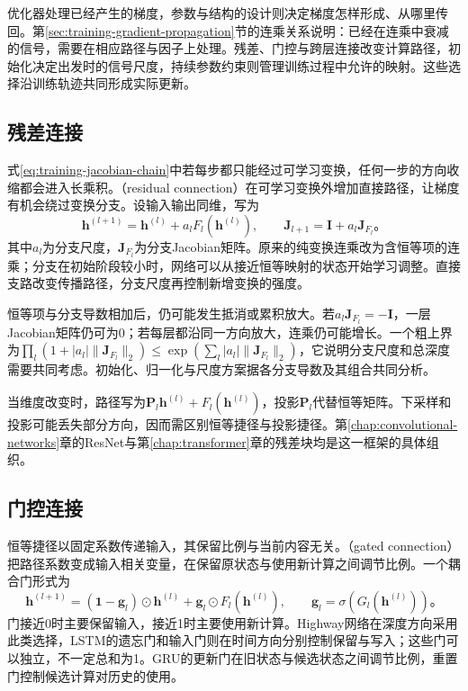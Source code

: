 优化器处理已经产生的梯度，参数与结构的设计则决定梯度怎样形成、从哪里传回。第\ref{sec:training-gradient-propagation}节的连乘关系说明：已经在连乘中衰减的信号，需要在相应路径与因子上处理。残差、门控与跨层连接改变计算路径，初始化决定出发时的信号尺度，持续参数约束则管理训练过程中允许的映射。这些选择沿训练轨迹共同形成实际更新。

\subsection{残差连接}
\label{sec:training-residual}

式\eqref{eq:training-jacobian-chain}中若每步都只能经过可学习变换，任何一步的方向收缩都会进入长乘积。（residual connection）在可学习变换外增加直接路径，让梯度有机会绕过变换分支。设输入输出同维，写为
\begin{equation}
  \bm h^{(l+1)}=\bm h^{(l)}+a_lF_l(\bm h^{(l)}),\qquad
  \bm J_{l+1}=\bm I+a_l\bm J_{F_l}\text{。}
  \label{eq:training-residual-jacobian}
\end{equation}
其中$a_l$为分支尺度，$\bm J_{F_l}$为分支Jacobian矩阵。原来的纯变换连乘改为含恒等项的连乘；分支在初始阶段较小时，网络可以从接近恒等映射的状态开始学习调整。直接支路改变传播路径，分支尺度再控制新增变换的强度。

恒等项与分支导数相加后，仍可能发生抵消或累积放大。若$a_l\bm J_{F_l}=-\bm I$，一层Jacobian矩阵仍可为0；若每层都沿同一方向放大，连乘仍可能增长。一个粗上界为$\prod_l(1+|a_l|\lVert\bm J_{F_l}\rVert_2)\leq\exp(\sum_l|a_l|\lVert\bm J_{F_l}\rVert_2)$，它说明分支尺度和总深度需要共同考虑。初始化、归一化与尺度方案据各分支导数及其组合共同分析。

当维度改变时，路径写为$\bm P_l\bm h^{(l)}+F_l(\bm h^{(l)})$，投影$\bm P_l$代替恒等矩阵。下采样和投影可能丢失部分方向，因而需区别恒等捷径与投影捷径。第\ref{chap:convolutional-networks}章的ResNet与第\ref{chap:transformer}章的残差块均是这一框架的具体组织。

\subsection{门控连接}
\label{sec:training-gates}

恒等捷径以固定系数传递输入，其保留比例与当前内容无关。（gated connection）把路径系数变成输入相关变量，在保留原状态与使用新计算之间调节比例。一个耦合门形式为
\begin{equation}
  \bm h^{(l+1)}=(\bm1-\bm g_l)\odot\bm h^{(l)}
                   +\bm g_l\odot F_l(\bm h^{(l)}),
  \qquad\bm g_l=\sigma(G_l(\bm h^{(l)}))\text{。}
  \label{eq:training-gated-connection}
\end{equation}
门接近0时主要保留输入，接近1时主要使用新计算。Highway网络在深度方向采用此类选择，LSTM的遗忘门和输入门则在时间方向分别控制保留与写入；这些门可以独立，不一定总和为1。GRU的更新门在旧状态与候选状态之间调节比例，重置门控制候选计算对历史的使用。

